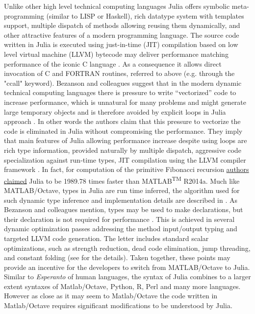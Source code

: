 Unlike other high level technical computing languages Julia offers symbolic meta-programming (similar to LISP or Haskell), rich datatype system with templates support, multiple dispatch of methods allowing reusing them dynamically, and other attractive features of a modern programming language. The source code written in Julia is executed using just-in-time (JIT) compilation based on low level virtual machine (LLVM) \cite{Lattner_2004} bytecode may deliver performance matching performance of the iconic C language \cite{bezanson2012julia, bezanson2014julia}. As a consequence it allows direct invocation of C and FORTRAN routines, referred to above (e.g. through the "ccall" keyword). Bezanson and colleagues suggest that in the modern dynamic technical computing languages there is pressure to write “vectorized” code to increase performance, which is unnatural for many problems and might generate large temporary objects and is therefore avoided by explicit loops in Julia approach \cite{bezanson2012julia}. In other words the authors claim that this pressure to vectorize the code is eliminated in Julia without compromising the performance. They imply that main features of Julia allowing performance increase despite using loops are rich type information, provided naturally by multiple dispatch, aggressive code specialization against run-time types, JIT compilation using the LLVM compiler framework \cite{bezanson2012julia, Lattner_2004}. In fact, for computation of the primitive Fibonacci recursion \href{http://julialang.org/benchmarks/}{authors claimed} Julia to be 1989.78 times faster than MATLAB\textsuperscript{TM} R2014a. Much like MATLAB/Octave, types in Julia are run time inferred, the algorithm used for such dynamic type inference and implementation details are described in \cite{Kaplan_1980, bezanson2012julia}. As Bezanson and colleagues mention, types may be used to make declarations, but their declaration is not required for performance \cite{bezanson2012julia}. This is achieved in several dynamic optimization passes addressing the method input/output typing and targeted LLVM code generation. The letter includes standard scalar optimizations, such as strength reduction, dead code elimination, jump threading, and constant folding (see \cite{bezanson2012julia} for the details). Taken together, these points may provide an incentive for the developers to switch from MATLAB/Octave to Julia. Similar to \textit{Esperanto} of human languages, the syntax of Julia combines to a larger extent syntaxes of Matlab/Octave, Python, R, Perl and many more languages. However as close as it may seem to Matlab/Octave the code written in Matlab/Octave requires significant modifications to be understood by Julia.

